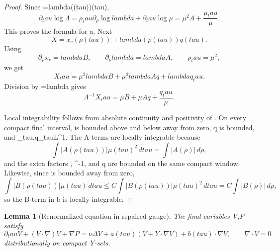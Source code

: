 \documentclass[11pt]{amsart}
\def\({}%
\def\){}%
\def\tau{tau}%
\def\lambda{lambda}%
\theoremstyle{plain}
\newtheorem{lemma}[lemma]{Lemma}
\theoremstyle{definition}
\theoremstyle{remark}
\begin{document}
\begin{proof}
Since \(\Lambda=\lambda(\rho(\tau))\mu(\tau)\),
\[
  \partial_\tau\log\Lambda
  =
  \rho_\tau\partial_\rho\log\lambda+\partial_\tau\log\mu
  =
  \mu^2A+\frac{\mu_\tau}{\mu}.
\]
This proves the formula for \(a\).  Next
\[
  X=x_c(\rho(\tau))+\lambda(\rho(\tau))q(\tau).
\]
Using
\[
  \partial_\rho x_c=\lambda B,\qquad
  \partial_\rho\lambda=\lambda A,\qquad
  \rho_\tau=\mu^2,
\]
we get
\[
  X_\tau
  =
  \mu^2\lambda B+\mu^2\lambda Aq+\lambda q_\tau.
\]
Division by \(\Lambda=\lambda\mu\) gives
\[
  \Lambda^{-1}X_\tau
  =
  \mu B+\mu Aq+\frac{q_\tau}{\mu}.
\]

Local integrability follows from absolute continuity and positivity of
\(\mu\).  On every compact final interval, \(\mu\) is bounded above and below
away from zero, \(q\) is bounded, and \(\mu_\tau,q_\tau\in L^1\).  The
\(A\)-terms are locally integrable because
\[
  \int |A(\rho(\tau))|\mu(\tau)^2\,d\tau
  =
  \int |A(\rho)|\,d\rho,
\]
and the extra factors \(\mu\), \(\mu^{-1}\), and \(q\) are bounded on the same
compact window.  Likewise, since \(\mu\) is bounded away from zero,
\[
  \int |B(\rho(\tau))|\mu(\tau)\,d\tau
  \le
  C\int |B(\rho(\tau))|\mu(\tau)^2\,d\tau
  =
  C\int |B(\rho)|\,d\rho,
\]
so the \(B\)-term in \(b\) is locally integrable.
\end{proof}

\begin{lemma}[Renormalized equation in repaired gauge]
\label{paper6a:lem:repaired-gauge-equation}
The final variables \(V,P\) satisfy
\[
  \partial_\tau V+(V\cdot\nabla)V+\nabla P
  =
  \nu\Delta V+a(\tau)(V+Y\cdot\nabla V)+b(\tau)\cdot\nabla V,
  \qquad
  \nabla\cdot V=0
\]
distributionally on compact \(Y\)-sets.
\end{lemma}
\end{document}
